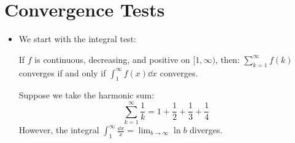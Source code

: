\section{Convergence Tests}
\begin{itemize}
    \item We start with the integral test:
    \begin{theorem}
        If $f$ is continuous, decreasing, and positive on $[1,\infty)$, then: $\sum_{k=1}^\infty f(k)$ converges if and only if $\int_1^\infty f(x) \dd{x}$ converges.
    \end{theorem}
    \begin{example}
        Suppose we take the harmonic sum:
        \begin{equation}
            \sum_{k=1}^\infty \frac{1}{k} = 1 + \frac{1}{2} + \frac{1}{3} + \frac{1}{4}
        \end{equation}
        However, the integral $\int_1^\infty \frac{\dd{x}}{x} = \lim_{b\to\infty} \ln b$ diverges.
    \end{example}
\end{itemize}
